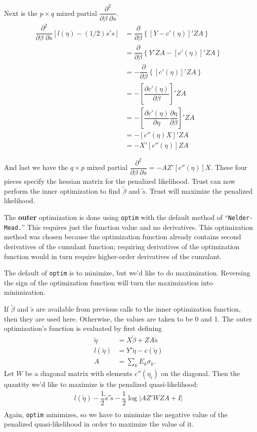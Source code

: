 \documentclass{article}
\begin{document}
Next is the $p \times q$ mixed partial $\dfrac{\partial^2}{  \partial \beta \; \partial s}$.
\begin{align}
\dfrac{\partial^2}{ \partial \beta \;  \partial s}  \left[ l(\eta) - (1/2) s's   \right] &= \dfrac{\partial}{\partial \beta} \left\{  \left[ Y-c'(\eta)  \right]' ZA  \right\}\\
&= \dfrac{\partial}{\partial \beta} \left\{Y'ZA-  \left[ c'(\eta)  \right]' ZA  \right\} \\
&=- \dfrac{\partial}{\partial \beta} \left\{  \left[ c'(\eta)  \right]' ZA  \right\} \\
&=- \left[  \dfrac{\partial  c'(\eta)}{\partial \beta}  \right]' ZA  \\
&=-   \left[  \dfrac{\partial  c'(\eta)}{\partial \eta} \dfrac{\partial \eta}{\partial \beta}  \right]' ZA   \\
&=-   \left[ c''(\eta) X  \right]' ZA   \\
&=-X'   \left[ c''(\eta)   \right] ZA  
\end{align}


And last we have the $q \times p$ mixed partial $\dfrac{\partial^2}{  \partial \beta \; \partial s}= -AZ' [c''(\eta)] X.$  These four pieces specify the hessian matrix for the penalized likelihood. Trust can now perform the inner optimization to find $\tilde{\beta}$ and $\tilde{s}$. Trust will maximize the penalized likelihood.





The {\bf outer} optimization is done using \texttt{optim} with the default method of ``\texttt{Nelder-Mead.}'' This requires just the function value and no derivatives.  This optimization method was chosen because the optimization function already contains second derivatives of the cumulant function; requiring derivatives of the optimization function would in turn require higher-order derivatives of the cumulant.  

The default of \texttt{optim} is to minimize, but we'd like to  do maximization. Reversing the sign of the optimization function will turn the maximization into minimization.

If $\tilde{\beta}$ and $\tilde{s}$ are available from previous calls to the inner optimization function, then they are used here. Otherwise, the values are taken to be 0 and 1. The outer optimization's function is evaluated by first defining
\begin{align}
\tilde{\eta} &= X \tilde{\beta} +ZA \tilde{s}\\
l(\tilde{\eta}) &= Y' \tilde{\eta} - c(\tilde{\eta})\\
A&= \sum_k E_k \sigma_k.
\end{align}
Let $W$ be a diagonal matrix with elements $c''(\eta_i)$ on the diagonal. Then the quantity we'd like to maximize is the penalized quasi-likelihood:
\begin{align}
 l(\tilde{\eta}) - \dfrac{1}{2} \tilde{s}' \tilde{s} - \dfrac{1}{2} \log  \left| AZ' W ZA +I  \right| \\
\end{align}
Again, \texttt{optim} minimizes, so we have to minimize the negative value of the penalized quasi-likelihood in order to maximize the value of it.
\end{document}
